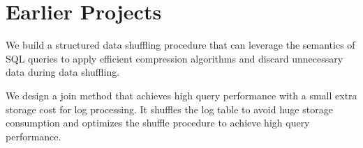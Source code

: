 \documentclass[10pt]{article} %
\begin{document}
\section{Earlier Projects}
{
We build a structured data shuffling procedure that can leverage the semantics of SQL queries to apply efficient compression algorithms 
and discard unnecessary data during data shuffling. 
}

{
We design a join method that achieves high query performance with a small extra storage cost for log processing. 
It shuffles the log table to avoid huge storage consumption and optimizes the shuffle procedure to achieve high query performance.
}

\vspace{-5mm}
\end{document}
